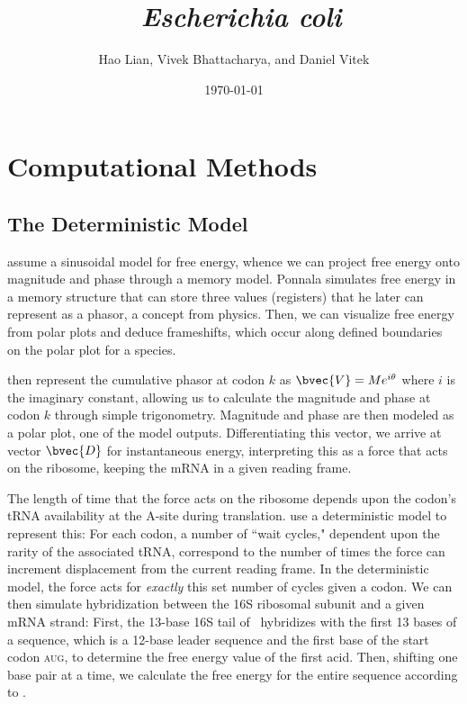 \documentclass[12pt, draft]{article}
\author{{\sc Hao Lian, Vivek Bhattacharya, and Daniel Vitek}}
\date{{\sc \today}}
\title{\bf{\BWFtitle~\emph{Escherichia coli}}}
\numberwithin{equation}{section}
\begin{document}
\maketitle
\tableofcontents
\clearpage
{}

\section{Computational Methods}
\subsection{The Deterministic Model}
\citet{lalit:mechanics} assume a sinusoidal model for
free energy, whence we can project free energy onto magnitude and
phase through a memory model. Ponnala simulates free
energy in a memory structure that can store three values (registers)
that he later can represent as a phasor, a concept from physics. Then,
we can visualize free energy from polar plots and deduce frameshifts,
which occur along defined boundaries~\citet{lalit:mechanics} on the polar plot for a species.
 
\citet{lalit:embs} then represent the cumulative phasor
at codon $k$ as $\bvec{V} = Me^{i\theta}$ where $i$ is the imaginary
constant, allowing us to calculate the magnitude and phase at codon
$k$ through simple trigonometry. Magnitude and phase are then modeled
as a polar plot, one of the model outputs. Differentiating this vector, we
arrive at vector $\bvec{D}$ for instantaneous energy, interpreting
this as a force that acts on the ribosome, keeping the mRNA in
a given reading frame.
 
The length of time that the force acts on the ribosome depends upon
the codon's tRNA availability at the A-site during translation.
\citeauthor{lalit:mechanics} use a deterministic model to represent this: For each codon,
a number of ``wait cycles," dependent upon the rarity of the
associated tRNA, correspond to the number of times the force can
increment displacement from the current reading frame.  In the
deterministic model, the force acts for \emph{exactly} this set number
of cycles given a codon. We can then simulate hybridization between the
16S ribosomal subunit and a given mRNA strand: First, the 13-base 16S
tail of \ecoli\ hybridizes with the first 13 bases of a sequence,
which is a 12-base leader sequence and the first base of the start
codon \textsc{aug}, to determine the free energy value of the first acid.
Then, shifting one base pair at a time, we calculate the free energy
for the entire sequence according to \citet{starmer}.
\end{document}
